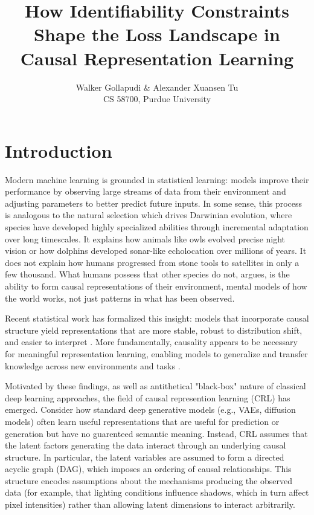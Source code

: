\documentclass{article} %
\title{How Identifiability Constraints Shape the Loss Landscape in Causal Representation Learning}
\author{Walker Gollapudi \& Alexander Xuansen Tu \\
CS 58700, Purdue University\\
}
\begin{document}
\maketitle

\section{Introduction}

Modern machine learning is grounded in statistical learning: models improve their performance by observing large streams of data from their environment and adjusting parameters to better predict future inputs. In some sense, this process is analogous to the natural selection which drives Darwinian evolution, where species have developed highly specialized abilities through incremental adaptation over long timescales. It explains how animals like owls evolved precise night vision or how dolphins developed sonar-like echolocation over millions of years. It does not explain how humans progressed from stone tools to satellites in only a few thousand. What humans possess that other species do not, \citet{Pearl2018SevenSparks} argues, is the ability to form causal representations of their environment, mental models of how the world works, not just patterns in what has been observed.

Recent statistical work has formalized this insight: models that incorporate causal structure yield representations that are more stable, robust to distribution shift, and easier to interpret \cite{Richens2024RobustAgents}. More fundamentally, causality appears to be necessary for meaningful representation learning, enabling models to generalize and transfer knowledge across new environments and tasks \cite{Scholkopf2021CRL, VonKugelgen2024IdentifiableCRL}.

Motivated by these findings, as well as antithetical "black-box" nature of classical deep learning approaches, the field of causal represention learning (CRL) has emerged. Consider how standard deep generative models (e.g., VAEs, diffusion models) often learn useful representations that are useful for prediction or generation but have no guarenteed semantic meaning. Instead, CRL assumes that the latent factors generating the data interact through an underlying causal structure. In particular, the latent variables are assumed to form a directed acyclic graph (DAG), which imposes an ordering of causal relationships. This structure encodes assumptions about the mechanisms producing the observed data (for example, that lighting conditions influence shadows, which in turn affect pixel intensities) rather than allowing latent dimensions to interact arbitrarily.
\end{document}
